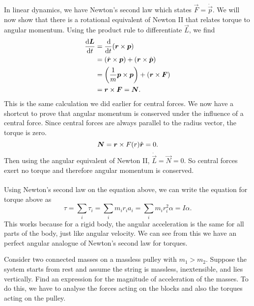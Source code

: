 \documentclass[../classical_mechanics.tex]{subfiles}
\begin{document}
        \paragraph{}
        In linear dynamics, we have Newton's second law which states $\vec{F}=\dot{\vec{p}}$.
        We will now show that there is a rotational equivalent of Newton II that relates torque to angular momentum.
        Using the product rule to differentiate $\vec{L}$, we find
        \begin{align}
            \dv{\vec{L}}{t}&=\dv{}{t}(\vec{r}\times\vec{p})\\
            &=(\dot{\vec{r}}\times\vec{p})+(\vec{r}\times\dot{\vec{p}})\\
            &=\left(\frac{1}{m}\vec{p}\times\vec{p}\right)+(\vec{r}\times\vec{F})\\
            &=\vec{r}\times\vec{F}=\vec{N}.
        \end{align}
        This is the same calculation we did earlier for central forces.
        We now have a shortcut to prove that angular momentum is conserved under the influence of a central force.
        Since central forces are always parallel to the radius vector, the torque is zero.
        \begin{equation}
            \boldsymbol{N}=\boldsymbol{r}\times F(r)\hat{\boldsymbol{r}}=0.
        \end{equation}
        Then using the angular equivalent of Newton II, $\dot{\vec{L}}=\vec{N}=0$.
        So central forces exert no torque and therefore angular momentum is conserved.

        \paragraph{}
        Using Newton's second law on the equation above, we can write the equation for torque above as
        \begin{equation}
            \tau=\sum_i\tau_i=\sum_im_ir_ia_i=\sum_im_ir_i^2\alpha=I\alpha.
        \end{equation}
        This works because for a rigid body, the angular acceleration is the same for all parts of the body, just like angular velocity.
        We can see from this we have an perfect angular analogue of Newton's second law for torques.
        \begin{example}
            Consider two connected masses on a massless pulley with $m_1>m_2$.
            Suppose the system starts from rest and assume the string is massless, inextensible, and lies vertically.
            Find an expression for the magnitude of acceleration of the masses.
            To do this, we have to analyse the forces acting on the blocks and also the torques acting on the pulley.
        \end{example}
\end{document}
